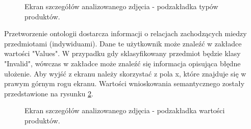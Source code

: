 {\begin{figure}[h]
	\caption{Ekran szczegółów analizowanego zdjęcia - podzakładka typów produktów.}
	\label{fig:typesView}	
\end{figure}
Przetworzenie ontologii dostarcza informacji o relacjach zachodzących miedzy przedmiotami (indywiduami). Dane te użytkownik może znaleźć w zakładce wartości "Values". W przypadku gdy sklasyfikowany przedmiot będzie klasy "Invalid", wówczas w zakładce może znaleźć się informacja opisująca błędne ułożenie.  Aby wyjść z ekranu należy skorzystać z pola x, które znajduje się w prawym górnym rogu ekranu. Wartości wnioskowania semantycznego zostały przedstawione na rysunku \ref{fig:details}.
\newpage
\begin{figure}[h]
	\centering
	\quad
	\caption{Ekran szczegółów analizowanego zdjęcia - podzakładka wartości produktów.}
	\label{fig:details}
\end{figure}
}

